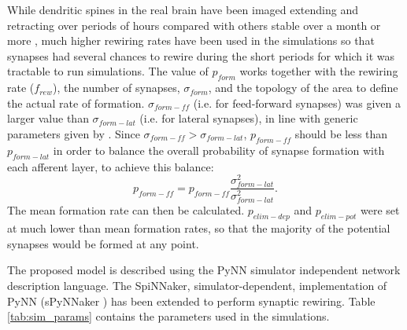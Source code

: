 \documentclass[preprint,12pt]{elsarticle}
\begin{document}
While dendritic spines in the real brain have been imaged extending and retracting over periods of hours compared with others stable over a month or more \cite{Grutzendler2002}, 
much higher rewiring rates have been used in the simulations so that synapses had several chances to rewire during the short periods for which it was tractable to run simulations.
The value of $p_{form}$ works together with the rewiring rate ($f_{rew}$), the number of synapses, $\sigma_{form}$, and the topology of the area to define the actual rate of formation.
$\sigma_{form-ff}$ (i.e. for feed-forward synapses) was given a larger value than $\sigma_{form-lat}$ (i.e. for lateral synapses), in line with generic parameters given by \cite{miikkulainen2006computational}.
Since $\sigma_{form-ff} > \sigma_{form-lat}$, $p_{form-ff}$ should be less than $p_{form-lat}$ in order to balance the overall probability of synapse formation with each afferent layer, to achieve this balance:
\begin{equation}
    p_{form-ff} = p_{form-ff} \frac{\sigma^2_{form-lat}}{\sigma^2_{form-lat}}.
\end{equation}
The mean formation rate can then be calculated. 
$p_{elim-dep}$ and $p_{elim-pot}$ were set at much lower than mean formation rates, so that the majority of the potential synapses would be formed at any point.

The proposed model is described using the PyNN \cite{davison2009pynn} simulator independent network description language. 
The SpiNNaker, simulator-dependent, implementation of PyNN (sPyNNaker \cite{rhodes2018spynnaker}) has been extended to perform synaptic rewiring. 
Table \ref{tab:sim_params} contains the parameters used in the simulations.
\end{document}
